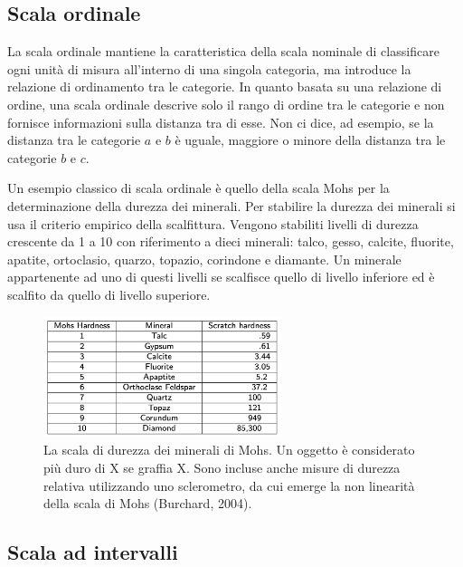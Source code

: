 \documentclass[
  letterpaper,
  DIV=11,
  numbers=noendperiod]{scrreprt}
\theoremstyle{definition}
\theoremstyle{remark}
\begin{document}
\subsection{Scala ordinale}\label{scala-ordinale}

La scala ordinale mantiene la caratteristica della scala nominale di
classificare ogni unità di misura all'interno di una singola categoria,
ma introduce la relazione di ordinamento tra le categorie. In quanto
basata su una relazione di ordine, una scala ordinale descrive solo il
rango di ordine tra le categorie e non fornisce informazioni sulla
distanza tra di esse. Non ci dice, ad esempio, se la distanza tra le
categorie \(a\) e \(b\) è uguale, maggiore o minore della distanza tra
le categorie \(b\) e \(c\).

Un esempio classico di scala ordinale è quello della scala Mohs per la
determinazione della durezza dei minerali. Per stabilire la durezza dei
minerali si usa il criterio empirico della scalfittura. Vengono
stabiliti livelli di durezza crescente da 1 a 10 con riferimento a dieci
minerali: talco, gesso, calcite, fluorite, apatite, ortoclasio, quarzo,
topazio, corindone e diamante. Un minerale appartenente ad uno di questi
livelli se scalfisce quello di livello inferiore ed è scalfito da quello
di livello superiore.

\begin{figure}[H]

{\centering \includegraphics[width=0.62\textwidth,height=\textheight]{chapters/key_notions/../../figures/mohs.png}

}

\caption{La scala di durezza dei minerali di Mohs. Un oggetto è
considerato più duro di X se graffia X. Sono incluse anche misure di
durezza relativa utilizzando uno sclerometro, da cui emerge la non
linearità della scala di Mohs (Burchard, 2004).}

\end{figure}%

\subsection{Scala ad intervalli}\label{scala-ad-intervalli}
\end{document}
